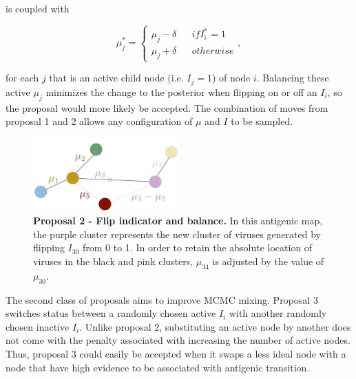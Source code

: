 \documentclass[11pt,oneside,letterpaper]{article}
\begin{document}
is coupled with

\begin{equation}
\label{muBalance-equation}
	\mu_j^{*} =  \left \{
\begin{array}{lllr}
    \mu_j - \delta	&	& if I_i^{*} = 1\\
    \mu_j + \delta	& & otherwise
\end{array}
\right.
,
\end{equation}

for each $j$ that is an active child node (i.e. $I_j = 1$) of node $i$. Balancing these active $\mu_j$ minimizes the change to the posterior when flipping on or off an $I_i$, so the proposal would more likely be accepted. The combination of moves from proposal 1 and 2 allows any configuration of $\mu$ and $I$ to be sampled.



\begin{figure}[h]
	\centering		
	\includegraphics[width=0.5\textwidth]{figures/lineart/flipAndBalance}
	\caption{\textbf{Proposal 2 - Flip indicator and balance.} 
In this antigenic map, the purple cluster represents the new cluster of viruses generated by flipping $I_{30}$ from 0 to 1. In order to retain the absolute location of viruses in the black and pink clusters,  $\mu_{34}$ is adjusted by the value of $\mu_{30}$.
	} 
	\label{flipAndBalance} 
\end{figure}


The second class of proposals aims to improve MCMC mixing.
Proposal 3 switches status between a randomly chosen active $I_i$ with another randomly chosen inactive $I_i$. 
Unlike proposal 2, substituting an active node by another does not come with the penalty associated with increasing the number of active nodes.
Thus, proposal 3 could easily be accepted when it swaps a less ideal node with a node that have high evidence to be associated with antigenic transition.
\end{document}
